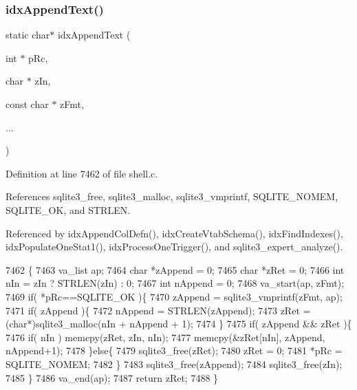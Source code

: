 \subsubsection{idx\+Append\+Text()}
{\footnotesize\ttfamily static char$\ast$ idx\+Append\+Text (\begin{DoxyParamCaption}\item[{int $\ast$}]{p\+Rc,  }\item[{char $\ast$}]{z\+In,  }\item[{const char $\ast$}]{z\+Fmt,  }\item[{}]{... }\end{DoxyParamCaption})\hspace{0.3cm}{\ttfamily [static]}}



Definition at line 7462 of file shell.\+c.



References sqlite3\+\_\+free, sqlite3\+\_\+malloc, sqlite3\+\_\+vmprintf, S\+Q\+L\+I\+T\+E\+\_\+\+N\+O\+M\+EM, S\+Q\+L\+I\+T\+E\+\_\+\+OK, and S\+T\+R\+L\+EN.



Referenced by idx\+Append\+Col\+Defn(), idx\+Create\+Vtab\+Schema(), idx\+Find\+Indexes(), idx\+Populate\+One\+Stat1(), idx\+Process\+One\+Trigger(), and sqlite3\+\_\+expert\+\_\+analyze().


\begin{DoxyCode}
7462                                                                       \{
7463   va\_list ap;
7464   \textcolor{keywordtype}{char} *zAppend = 0;
7465   \textcolor{keywordtype}{char} *zRet = 0;
7466   \textcolor{keywordtype}{int} nIn = zIn ? STRLEN(zIn) : 0;
7467   \textcolor{keywordtype}{int} nAppend = 0;
7468   va\_start(ap, zFmt);
7469   \textcolor{keywordflow}{if}( *pRc==SQLITE_OK )\{
7470     zAppend = sqlite3_vmprintf(zFmt, ap);
7471     \textcolor{keywordflow}{if}( zAppend )\{
7472       nAppend = STRLEN(zAppend);
7473       zRet = (\textcolor{keywordtype}{char}*)sqlite3_malloc(nIn + nAppend + 1);
7474     \}
7475     \textcolor{keywordflow}{if}( zAppend && zRet )\{
7476       \textcolor{keywordflow}{if}( nIn ) memcpy(zRet, zIn, nIn);
7477       memcpy(&zRet[nIn], zAppend, nAppend+1);
7478     \}\textcolor{keywordflow}{else}\{
7479       sqlite3_free(zRet);
7480       zRet = 0;
7481       *pRc = SQLITE_NOMEM;
7482     \}
7483     sqlite3_free(zAppend);
7484     sqlite3_free(zIn);
7485   \}
7486   va\_end(ap);
7487   \textcolor{keywordflow}{return} zRet;
7488 \}
\end{DoxyCode}
\mbox{\label{shell_8c_a3c7554b7c77c3fc779ffd65154ae5f72}} 
